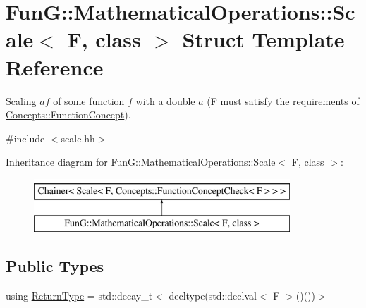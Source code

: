 \hypertarget{structFunG_1_1MathematicalOperations_1_1Scale}{}\section{Fun\+G\+:\+:Mathematical\+Operations\+:\+:Scale$<$ F, class $>$ Struct Template Reference}
\label{structFunG_1_1MathematicalOperations_1_1Scale}


Scaling $ af $ of some function $ f $ with a double $ a $ (F must satisfy the requirements of \hyperlink{structFunG_1_1Concepts_1_1FunctionConcept}{Concepts\+::\+Function\+Concept}).  




{\ttfamily \#include $<$scale.\+hh$>$}

Inheritance diagram for Fun\+G\+:\+:Mathematical\+Operations\+:\+:Scale$<$ F, class $>$\+:\begin{figure}[H]
\begin{center}
\leavevmode
\includegraphics[height=2.000000cm]{structFunG_1_1MathematicalOperations_1_1Scale}
\end{center}
\end{figure}
\subsection*{Public Types}
\begin{DoxyCompactItemize}
\item 
using \hyperlink{structFunG_1_1MathematicalOperations_1_1Scale_ab523d0773ef3380dcdf035cc19b01b5f}{Return\+Type} = std\+::decay\+\_\+t$<$ decltype(std\+::declval$<$ F $>$()())$>$
\end{DoxyCompactItemize}
